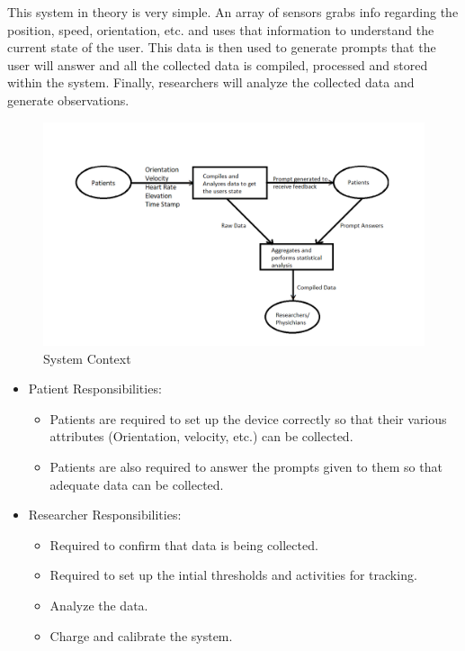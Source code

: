 \documentclass[12pt]{article}
\begin{document}
This system in theory is very simple. An array of sensors grabs info regarding the position, speed, orientation, etc. and uses that information to understand the current state of the user. This data is then used to generate prompts that the user will answer and all the collected data is compiled, processed and stored within the system. Finally, researchers will analyze the collected data and generate observations. 
\begin{figure}[h!]

\begin{center}
 \includegraphics[width=.95\textwidth]{System Context Diagram}
\caption{System Context}
\label{Fig_SystemContext} 
\end{center}
\end{figure}


\begin{itemize}

\item Patient Responsibilities:
\begin{itemize}
\item Patients are required to set up the device correctly so that their various attributes (Orientation, velocity, etc.) can be collected.
\item Patients are also required to answer the prompts given to them so that adequate data can be collected.
\end{itemize}
\item Researcher Responsibilities:
\begin{itemize}
\item Required to confirm that data is being collected.
\item Required to set up the intial thresholds and activities for tracking.
\item Analyze the data.
\item Charge and calibrate the system.
\end{itemize}
\end{itemize}
\newpage
\end{document}
